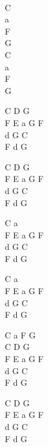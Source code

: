\begin{chord}
[Recytacja]\\
C\\
a\\
F\\
G\\
C\\
a\\
F\\
G

C D G\\
F E a G F\\
d G C\\
F d G

C D G\\
F E a G F\\
d G C\\
F d G

C a\\
F E a G F\\
d G C\\
F d G

C a\\
F E a G F\\
d G C\\
F d G

C a F G\\
C D G\\
F E a G F\\
d G C\\
F d G

C D G\\
F E a G F\\
d G C\\
F d G
\end{chord}
